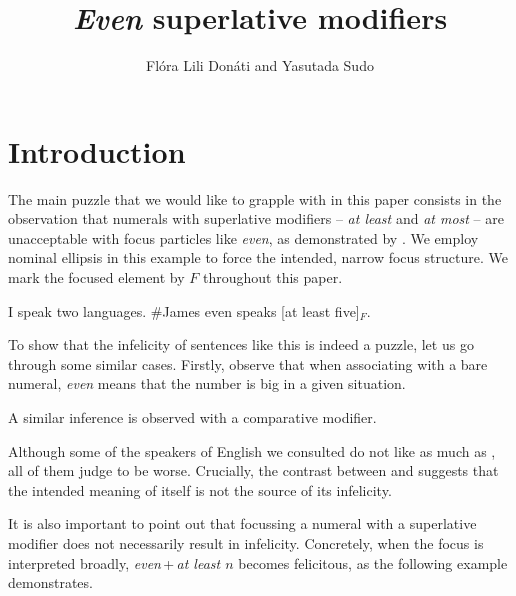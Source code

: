 \documentclass[output=paper]{langscibook}
\author{Flóra Lili Donáti\affiliation{SFL, Université Paris 8} and
Yasutada Sudo\affiliation{University College London}}
\title[\textup{Even} superlative modifiers]{\textit{Even} superlative modifiers}
\begin{document}
\maketitle



\section{Introduction}

The main puzzle that we would like to grapple with in this paper consists in the observation that numerals with superlative modifiers -- \textit{at least} and \textit{at most} -- are unacceptable with focus particles like \textit{even}, as demonstrated by . We employ nominal ellipsis in this example to force the intended, narrow focus structure. We mark the focused element by $F$ throughout this paper.

    \ea
    I speak two languages.
    \#James even speaks [at least five]$_F$.\label{don-sud:langs}
    \z

\noindent To show that the infelicity of sentences like this is indeed a puzzle, let us go through some similar cases. Firstly, observe that when associating with a bare numeral, \textit{even} means that the number is big in a given situation. 

    \z
  
\noindent A similar inference is observed with a comparative modifier.

    \z
   
\noindent Although some of the speakers of English we consulted do not like  as much as , all of them judge  to be worse. Crucially, the contrast between  and  suggests that the intended meaning of  itself is not the source of its infelicity.

    It is also important to point out that focussing a numeral with a superlative modifier does not necessarily result in infelicity. Concretely, when the focus is interpreted broadly, \textit{even}\,+\,\textit{at least $n$} becomes felicitous, as the following example demonstrates.
\end{document}
